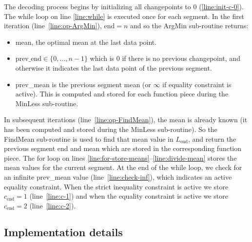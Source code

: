 \documentclass{article}
\begin{document}
The decoding process begins by initializing all changepoints to 0
(\ref{line:init-c-0}). The while loop on line \ref{line:while} is
executed once for each segment. In the first iteration
(line~\ref{line:op-ArgMin}), $\text{end}=n$ and so the ArgMin
sub-routine returns:
\begin{itemize}
\item mean, the optimal mean at the last data point.
\item $\text{prev\_end}\in\{0,\dots,n-1\}$ which is 0 if there is no
  previous changepoint, and otherwise it indicates the last data point
  of the previous segment.
\item prev\_mean is the previous segment mean (or $\infty$ if equality
  constraint is active). This is computed and stored for each function
  piece during the MinLess sub-routine.
\end{itemize}
In subsequent iterations (line~\ref{line:op-FindMean}), the mean is
already known (it has been computed and stored during the MinLess
sub-routine). So the FindMean sub-routine is used to find that mean
value in $L_{\text{end}}$, and return the previous segment end and
mean which are stored in the corresponding function piece. The for
loop on lines \ref{line:for-store-means}--\ref{line:divide-mean}
stores the mean values for the current segment. At the end of the
while loop, we check for an infinite prev\_mean value
(line~\ref{line:check-inf}), which indicates an active equality
constraint. When the strict inequality constraint is active we store
$c_{\text{end}}=1$ (line~\ref{line:c-1}) and when the equality
constraint is active we store $c_{\text{end}}=2$
(line~\ref{line:c-2}).

\subsection{Implementation details}
\end{document}
